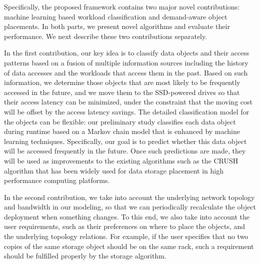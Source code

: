 Specifically, the proposed framework contains two major novel contributions: machine learning based workload classification and demand-aware object placements. In both parts, we present novel algorithms and evaluate their performance. We next describe these two contributions separately.

In the first contribution, our key idea is to classify data objects and their access patterns based on a fusion of multiple information sources including the history of data accesses and the workloads that access them in the past. Based on such information, we determine those objects that are most likely to be frequently accessed in the future, and we move them to the SSD-powered drives so that their access latency can be minimized, under the constraint that the moving cost will be offset by the access latency savings. The detailed classification model for the objects can be flexible: our preliminary study classifies each data object during runtime based on a Markov chain model that is enhanced by machine learning techniques. Specifically, our goal is to predict whether this data object will be accessed frequently in the future. Once such predictions are made, they will be used as improvements to the existing algorithms such as the CRUSH algorithm that has been widely used for data storage placement in high performance computing platforms.

In the second contribution, we take into account the underlying network topology and bandwidth in our modeling, so that we can periodically recalculate the object deployment when something changes. To this end, we also take into account the user requirements, such as their preferences on where to place the objects, and the underlying topology relations. For example, if the user specifies that no two copies of the same storage object should be on the same rack, such a requirement should be fulfilled properly by the storage algorithm.

%


